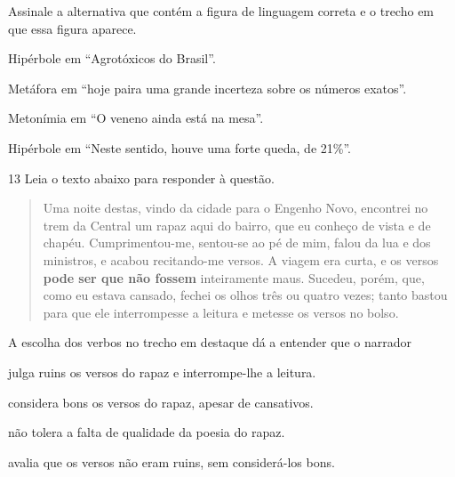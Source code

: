 
Assinale a alternativa que contém a figura de linguagem correta e o
trecho em que essa figura aparece.

\begin{escolha}

    \item Hipérbole em ``Agrotóxicos do Brasil''. 

    \item Metáfora em ``hoje paira uma grande incerteza sobre os números exatos''. 

    \item Metonímia em ``O veneno ainda está na mesa''. 

    \item Hipérbole em ``Neste sentido, houve uma forte queda, de 21\%''. 

\end{escolha}

\num{13} Leia o texto abaixo para responder à questão. 

\begin{quote}

Uma noite destas, vindo da cidade para o Engenho
Novo, encontrei no trem da Central um rapaz aqui do
bairro, que eu conheço de vista e de chapéu. 
Cumprimentou-me, sentou-se ao pé de mim, falou da lua
e dos ministros, e acabou recitando-me versos. A viagem 
era curta, e os versos \textbf{pode ser que não fossem} 
inteiramente maus. Sucedeu, porém, que, como eu estava 
cansado, fechei os olhos três ou quatro vezes; tanto 
bastou para que ele interrompesse a leitura e metesse 
os versos no bolso.

\end{quote}


A escolha dos verbos no trecho em destaque dá a entender que o narrador

\begin{escolha}

  \item julga ruins os versos do rapaz e interrompe-lhe a leitura.

  \item considera bons os versos do rapaz, apesar de cansativos.

  \item não tolera a falta de qualidade da poesia do rapaz.

  \item avalia que os versos não eram ruins, sem considerá-los bons.

\end{escolha}

